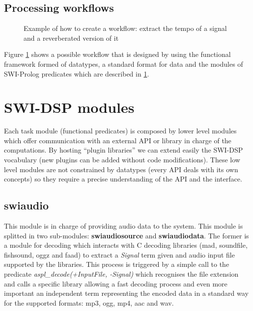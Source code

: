 \documentclass[runningheads]{llncs}
\begin{document}
\subsection{Processing workflows}\label{subsec:worflow}

\begin{figure}
\centerline{}
\caption{Example of how to create a workflow: extract the tempo of a signal and a reverberated version of it}
\label{fig:workflow}
\end{figure}

Figure \ref{fig:workflow} shows a possible workflow that is designed by using the functional framework formed of datatypes, a standard format for data and the modules of SWI-Prolog predicates which are described in \ref{sec:modules}.

\section{SWI-DSP modules}\label{sec:modules}

Each task module (functional predicates) is composed by lower level modules which offer communication with an external API or library in charge of the computations. By hosting ``plugin libraries'' we can extend easily the SWI-DSP vocabulary (new plugins can be added without code modifications). These low level modules are not constrained by datatypes (every API deals with its own concepts) so they require a precise understanding of the API and the interface.

\subsection{swiaudio}\label{subsec:swiaudio}

This module is in charge of providing audio data to the system. This module is splitted in two sub-modules: \textbf{swiaudiosource} and \textbf{swiaudiodata}. The former is a module for decoding which interacts with C decoding libraries (mad, soundfile, fishsound, oggz and faad) to extract a \textit{Signal} term given and audio input file supported by the libraries. This process is triggered by a simple call to the predicate \textit{aspl\_decode(+InputFile, -Signal)} which recognises the file extension and calls a specific library allowing a fast decoding process and even more important an independent term representing the encoded data in a standard way for the supported formats: mp3, ogg, mp4, aac and wav.
\end{document}
